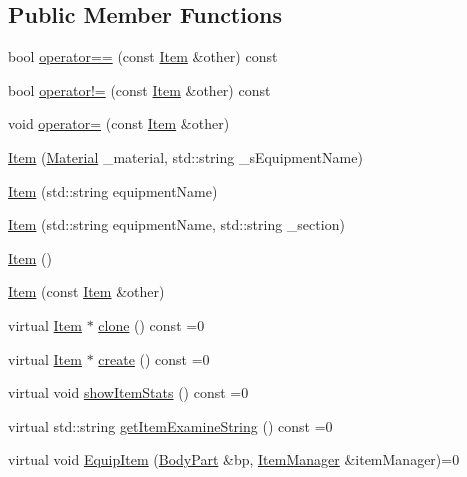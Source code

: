 \subsection*{Public Member Functions}
\begin{DoxyCompactItemize}
\item 
bool \mbox{\hyperlink{class_item_a754d81f7346aebb775b16969a89021b4}{operator==}} (const \mbox{\hyperlink{class_item}{Item}} \&other) const
\item 
bool \mbox{\hyperlink{class_item_a612c595b62d2f7b9c5cd2b085a14b365}{operator!=}} (const \mbox{\hyperlink{class_item}{Item}} \&other) const
\item 
void \mbox{\hyperlink{class_item_a47267a43bfae3f28e183170f45783da5}{operator=}} (const \mbox{\hyperlink{class_item}{Item}} \&other)
\item 
\mbox{\hyperlink{class_item_a931e8f47fe5a367166280f28edca3950}{Item}} (\mbox{\hyperlink{class_material}{Material}} \+\_\+material, std\+::string \+\_\+s\+Equipment\+Name)
\item 
\mbox{\hyperlink{class_item_aa7071a91f151036f7fd1a87e12a07f83}{Item}} (std\+::string equipment\+Name)
\item 
\mbox{\hyperlink{class_item_ac84b16ca0e3ce8554dbd817d62bcbab0}{Item}} (std\+::string equipment\+Name, std\+::string \+\_\+section)
\item 
\mbox{\hyperlink{class_item_a297720c02984eab37332ae795d22189d}{Item}} ()
\item 
\mbox{\hyperlink{class_item_a44f7e3f580bd6c0fa2e1c288dff484be}{Item}} (const \mbox{\hyperlink{class_item}{Item}} \&other)
\item 
virtual \mbox{\hyperlink{class_item}{Item}} $\ast$ \mbox{\hyperlink{class_item_a6d963581e2caad2e08979683a827f39f}{clone}} () const =0
\item 
virtual \mbox{\hyperlink{class_item}{Item}} $\ast$ \mbox{\hyperlink{class_item_a17b3fa0cef44ada961e0d3c65e1de864}{create}} () const =0
\item 
virtual void \mbox{\hyperlink{class_item_aaf7dae41afdce432c11261043e8e4e30}{show\+Item\+Stats}} () const =0
\item 
virtual std\+::string \mbox{\hyperlink{class_item_a00e06647e1adeb62f2d95044476126ac}{get\+Item\+Examine\+String}} () const =0
\item 
virtual void \mbox{\hyperlink{class_item_ad1a25684e25e0fc14cbe88f77ea035c2}{Equip\+Item}} (\mbox{\hyperlink{class_body_part}{Body\+Part}} \&bp, \mbox{\hyperlink{class_item_manager}{Item\+Manager}} \&item\+Manager)=0

\end{DoxyCompactItemize}
